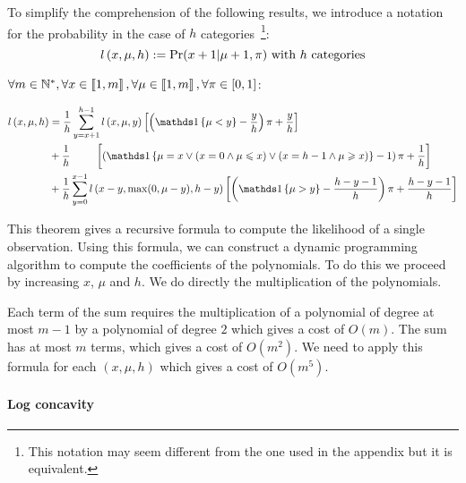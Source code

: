 \begin{definition}
    To simplify the comprehension of the following results, we introduce a notation for the probability in the case of $h$ categories~\footnote{This notation may seem different from the one used in the appendix but it is equivalent.}:
    \[ \mathnormal{l}\left(x, \mu, h\right) := \Pr(x + 1 | \mu + 1, \pi) \text{ with }h\text{ categories}\]
\end{definition}

\begin{thm}
    \label{thm:computing_likelihood_bos}
    $\forall m \in \mathbb{N}^*, \forall x \in \left\llbracket1, m\right\rrbracket, \forall \mu \in \left\llbracket1, m\right\rrbracket, \forall \pi \in [0, 1]$:

\begin{equation}
    \begin{aligned}
        \bosl{x}{\mu}{h}
        &=\frac{1}{h} \sum_{y = x + 1}^{h - 1} \bosl{x}{\mu}{y} \left[ \left( \indickronecker{\mu < y} - \frac{y}{h} \right) \pi + \frac{y}{h} \right] \\
            &+\frac{1}{h} \ \qquad \left[ \left( \indickronecker{\mu = x \lor (x = 0 \land \mu \leq x) \lor (x = h - 1 \land \mu \geq x)} - 1 \right) \pi +  \frac{1}{h} \right] \\
            &+\frac{1}{h} \sum_{y = 0}^{x - 1}\bosl{x - y}{\max(0, \mu - y)}{h - y}    \left[ \left( \indickronecker{\mu > y} - \frac{h - y - 1}{h} \right) \pi + \frac{h - y - 1}{h} \right]
    \end{aligned} \\
\end{equation}
\end{thm}

This theorem gives a recursive formula to compute the likelihood of a single observation. Using this formula, we can construct a dynamic programming algorithm to compute the coefficients of the polynomials. To do this we proceed by increasing $x$, $\mu$ and $h$. We do directly the multiplication of the polynomials.

Each term of the sum requires the multiplication of a polynomial of degree at most $m - 1$ by a polynomial of degree $2$ which gives a cost of $O(m)$. The sum has at most $m$ terms, which gives a cost of $O(m^2)$. We need to apply this formula for each $(x, \mu, h)$ which gives a cost of $O(m^5)$.

\paragraph{Log concavity}

